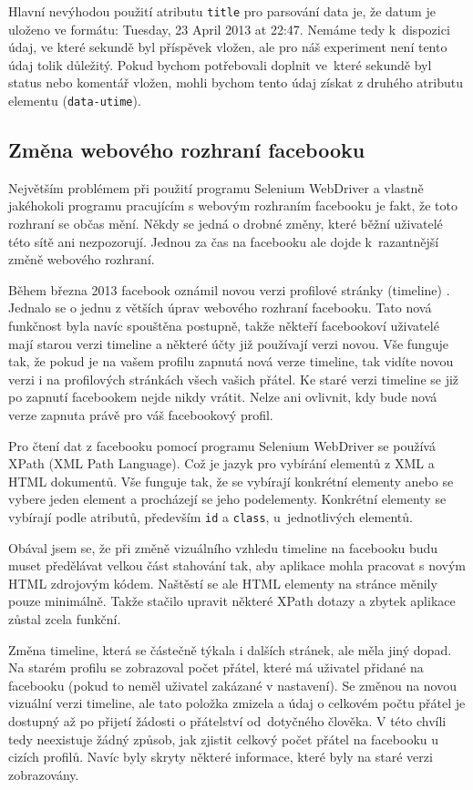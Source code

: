 \documentclass[thesis=M,czech]{FITthesis}[2013/05/10]
\begin{document}
Hlavní nevýhodou použití atributu \verb|title| pro parsování data je, že datum je uloženo ve formátu: Tuesday, 23 April 2013 at 22:47. Nemáme tedy k~dispozici údaj, ve které sekundě byl příspěvek vložen, ale pro náš experiment není tento údaj tolik důležitý. Pokud bychom potřebovali doplnit ve~které sekundě byl status nebo komentář vložen, mohli bychom tento údaj získat z druhého atributu elementu (\verb|data-utime|). 

\subsection{Změna webového rozhraní facebooku}

Největším problémem při použití programu Selenium WebDriver a vlastně jakéhokoli programu pracujícím s webovým rozhraním facebooku je fakt, že toto rozhraní se občas mění. Někdy se jedná o drobné změny, které běžní uživatelé této sítě ani nezpozorují. Jednou za čas na facebooku ale dojde k~razantnější změně webového rozhraní.

Během března 2013 facebook oznámil novou verzi profilové stránky (timeline) \cite{web:fbTimelineImprovements}. Jednalo se o jednu z větších úprav webového rozhraní facebooku. Tato nová funkčnost byla navíc spouštěna postupně, takže někteří facebookoví uživatelé mají starou verzi timeline a některé účty již používají verzi novou. Vše funguje tak, že pokud je na vašem profilu zapnutá nová verze timeline, tak vidíte novou verzi i na profilových stránkách všech vašich přátel. Ke staré verzi timeline se již po zapnutí facebookem nejde nikdy vrátit. Nelze ani ovlivnit, kdy bude nová verze zapnuta právě pro váš facebookový profil.

Pro čtení dat z facebooku pomocí programu Selenium WebDriver se používá XPath (XML Path Language). Což je jazyk pro vybírání elementů z XML a HTML dokumentů. Vše funguje tak, že se vybírají konkrétní elementy anebo se vybere jeden element a procházejí se jeho podelementy. Konkrétní elementy se vybírají podle atributů, především \verb|id| a \verb|class|, u~jednotlivých elementů.

Obával jsem se, že při změně vizuálního vzhledu timeline na facebooku budu muset předělávat velkou část stahování tak, aby aplikace mohla pracovat s novým HTML zdrojovým kódem. Naštěstí se ale HTML elementy na stránce měnily pouze minimálně. Takže stačilo upravit některé XPath dotazy a zbytek aplikace zůstal zcela funkční.

Změna timeline, která se částečně týkala i dalších stránek, ale měla jiný dopad. Na starém profilu se zobrazoval počet přátel, které má uživatel přidané na facebooku (pokud to neměl uživatel zakázané v nastavení). Se změnou na novou vizuální verzi timeline, ale tato položka zmizela a údaj o celkovém počtu přátel je dostupný až po přijetí žádosti o přátelství od~dotyčného člověka. V této chvíli tedy neexistuje žádný způsob, jak zjistit celkový počet přátel na facebooku u cizích profilů. Navíc byly skryty některé informace, které byly na staré verzi zobrazovány.
\end{document}
